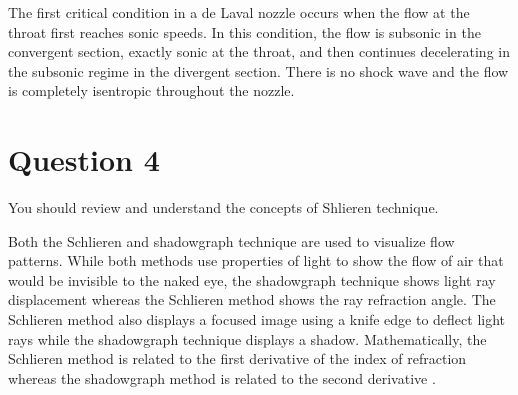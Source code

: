 The first critical condition in a de Laval nozzle occurs when the flow at the throat first reaches sonic speeds. In this condition, the flow is subsonic in the convergent section, exactly sonic at the throat, and then continues decelerating in the subsonic regime in the divergent section. There is no shock wave and the flow is completely isentropic throughout the nozzle.

\section{Question 4}
\begin{importantbox}
    You should review and understand the concepts of Shlieren technique.
\end{importantbox}

Both the Schlieren and shadowgraph technique are used to visualize flow patterns. While both methods use properties of light to show the flow of air that would be invisible to the naked eye, the shadowgraph technique shows light ray displacement whereas the Schlieren method shows the ray refraction angle. The Schlieren method also displays a focused image using a knife edge to deflect light rays while the shadowgraph technique displays a shadow. Mathematically, the Schlieren method is related to the first derivative of the index of refraction whereas the shadowgraph method is related to the second derivative \citep{lecture9}.